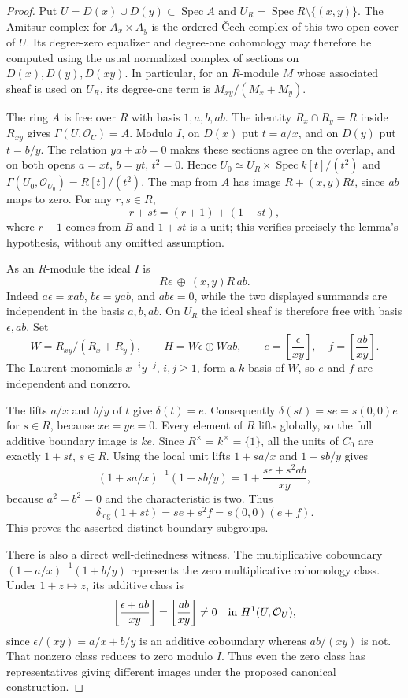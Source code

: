 \begin{proof}
Put $U=D(x)\cup D(y)\subset\operatorname{Spec}A$ and
$U_R=\operatorname{Spec}R\setminus\{(x,y)\}$.
The Amitsur complex for $A_x\times A_y$ is the ordered \v Cech complex of
this two-open cover of $U$.  Its degree-zero equalizer and degree-one
cohomology may therefore be computed using the usual normalized complex
of sections on $D(x),D(y),D(xy)$.  In particular, for an $R$-module $M$
whose associated sheaf is used on $U_R$, its degree-one term is
$M_{xy}/(M_x+M_y)$.

The ring $A$ is free over $R$ with basis $1,a,b,ab$.  The identity
$R_x\cap R_y=R$ inside $R_{xy}$ gives $\Gamma(U,\mathcal O_U)=A$.
Modulo $I$, on $D(x)$ put $t=a/x$, and on $D(y)$ put $t=b/y$.
The relation $ya+xb=0$ makes these sections agree on the overlap, and
on both opens $a=xt$, $b=yt$, $t^2=0$.  Hence
$U_0\simeq U_R\times\operatorname{Spec}k[t]/(t^2)$ and
$\Gamma(U_0,\mathcal O_{U_0})=R[t]/(t^2)$.
The map from $A$ has image $R+(x,y)Rt$, since $ab$ maps to zero.
For any $r,s\in R$,
\[
             r+st=(r+1)+(1+st),
\]
where $r+1$ comes from $B$ and $1+st$ is a unit; this verifies precisely
the lemma's hypothesis, without any omitted assumption.

As an $R$-module the ideal $I$ is
\[
           R\epsilon\ \oplus\ (x,y)R\,ab.
\]
Indeed $a\epsilon=xab$, $b\epsilon=yab$, and
$ab\epsilon=0$, while the two displayed summands are independent in
the basis $a,b,ab$.  On $U_R$ the ideal sheaf is therefore free with
basis $\epsilon,ab$.  Set
\[
 W=R_{xy}/(R_x+R_y),\qquad
 H=W\epsilon\oplus W ab,\qquad
 e=\left[\frac{\epsilon}{xy}\right],\quad
 f=\left[\frac{ab}{xy}\right].
\]
The Laurent monomials $x^{-i}y^{-j}$, $i,j\geq1$, form a $k$-basis of
$W$, so $e$ and $f$ are independent and nonzero.

The lifts $a/x$ and $b/y$ of $t$ give $\delta(t)=e$.
Consequently $\delta(st)=s e=s(0,0)e$ for $s\in R$, because $x e=y e=0$.
Every element of $R$ lifts globally, so the full additive boundary image
is $k e$.  Since $R^\times=k^\times=\{1\}$, all the units of $C_0$ are
exactly $1+st$, $s\in R$.  Using the local unit lifts
$1+sa/x$ and $1+sb/y$ gives
\[
 (1+sa/x)^{-1}(1+sb/y)
   =1+\frac{s\epsilon+s^2ab}{xy},
\]
because $a^2=b^2=0$ and the characteristic is two.  Thus
\[
 \delta_{\log}(1+st)=s e+s^2 f=s(0,0)(e+f).
\]
This proves the asserted distinct boundary subgroups.

There is also a direct well-definedness witness.  The multiplicative
coboundary $(1+a/x)^{-1}(1+b/y)$ represents the zero multiplicative
cohomology class.  Under $1+z\mapsto z$, its additive class is
\[
 \left[\frac{\epsilon+ab}{xy}\right]
   =\left[\frac{ab}{xy}\right]\ne0
       \quad\hbox{in }H^1(U,\mathcal O_U),
\]
since $\epsilon/(xy)=a/x+b/y$ is an additive coboundary whereas
$ab/(xy)$ is not.  That nonzero class reduces to zero modulo $I$.
Thus even the zero class has representatives giving different images
under the proposed canonical construction.
\end{proof}

